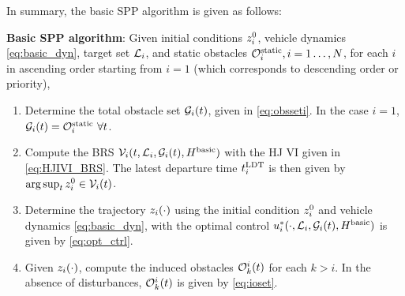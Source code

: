 In summary, the basic SPP algorithm is given as follows:

\begin{alg}
\label{alg:basic}
\textbf{Basic SPP algorithm}: Given initial conditions $z_i^0$, vehicle dynamics \eqref{eq:basic_dyn}, target set $\mathcal{L}_i$, and static obstacles $\mathcal{O}^\text{static}_i, i = 1\ldots, N$, for each $i$ in ascending order starting from $i=1$ (which corresponds to descending order or priority),
\begin{enumerate}
\item Determine the total obstacle set $\mathcal{G}_i(t)$, given in \eqref{eq:obsseti}. In the case $i=1$, $\mathcal{G}_i(t) = \mathcal{O}^\text{static}_i ~ \forall t$.
\item Compute the BRS $\mathcal{V}_i(t, \mathcal{L}_i, \mathcal{G}_i(t), H^\text{basic})$ with the HJ VI given in  \eqref{eq:HJIVI_BRS}. The latest departure time $t^\text{LDT}_i$ is then given by $\arg \sup_t z^0_i \in \mathcal{V}_i(t)$.
\item Determine the trajectory $z_i(\cdot)$ using the initial condition $z_i^0$ and vehicle dynamics \eqref{eq:basic_dyn}, with the optimal control  $u_i^*(\cdot, \mathcal{L}_i, \mathcal{G}_i(t), H^\text{basic})$ is given by \eqref{eq:opt_ctrl}.
\item Given $z_i(\cdot)$, compute the induced obstacles $\mathcal{O}_k^i(t)$ for each $k>i$. In the absence of disturbances, $\mathcal{O}_k^i(t)$ is given by \eqref{eq:ioset}.
\end{enumerate}
\end{alg}